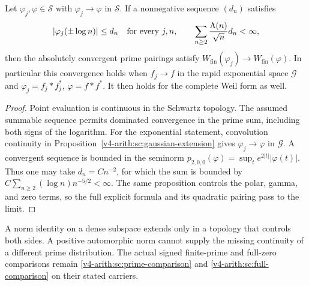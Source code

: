 \begin{theorem}
\label{v4-arith:w6-b:thm:schwartz-closure}
Let $\varphi_j,\varphi\in\mathscr S$ with
$\varphi_j\to\varphi$ in $\mathscr S$.
If a nonnegative sequence $(d_n)$ satisfies
\[
 |\varphi_j(\pm\log n)|\le d_n\quad\hbox{for every }j,n,
 \qquad \sum_{n\ge2}\frac{\Lambda(n)}{\sqrt n}d_n<\infty,
\]
then the absolutely convergent prime pairings satisfy
$W_{\mathrm{fin}}(\varphi_j)\to W_{\mathrm{fin}}(\varphi)$.
In particular this convergence holds when $f_j\to f$ in the
rapid exponential space $\mathscr G$ and
$\varphi_j=f_j*f_j^*$, $\varphi=f*f^*$.
It then holds for the complete Weil form as well.
\end{theorem}
\begin{proof}
Point evaluation is continuous in the Schwartz topology.
The assumed summable sequence permits dominated convergence in the
prime sum, including both signs of the logarithm.
For the exponential statement, convolution continuity in
Proposition~\ref{v4-arith:sc:gaussian-extension} gives
$\varphi_j\to\varphi$ in $\mathscr G$.
A convergent sequence is bounded in the seminorm
$p_{2,0,0}(\varphi)=\sup_t e^{2|t|}|\varphi(t)|$.
Thus one may take $d_n=Cn^{-2}$, for which the sum is bounded by
$C\sum_{n\ge2}(\log n)n^{-5/2}<\infty$.
The same proposition controls the polar, gamma, and zero terms,
so the full explicit formula and its quadratic pairing pass to the limit.
\end{proof}

A norm identity on a dense subspace extends only in a topology that
controls both sides. A positive automorphic norm cannot supply the
missing continuity of a different prime distribution.
The actual signed finite-prime and full-zero comparisons remain
\eqref{v4-arith:sc:prime-comparison} and
\eqref{v4-arith:sc:full-comparison} on their stated carriers.
